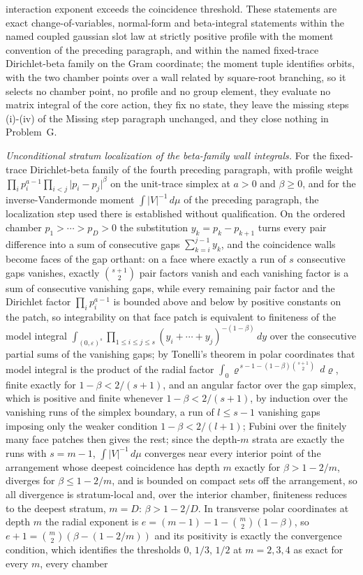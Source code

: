 interaction exponent exceeds the coincidence threshold. These statements are exact change-of-variables, normal-form and beta-integral statements within the named coupled gaussian slot law at strictly positive profile with the moment convention of the preceding paragraph, and within the named fixed-trace Dirichlet-beta family on the Gram coordinate; the moment tuple identifies orbits, with the two chamber points over a wall related by square-root branching, so it selects no chamber point, no profile and no group element, they evaluate no matrix integral of the core action, they fix no state, they leave the missing steps (i)-(iv) of the Missing step paragraph unchanged, and they close nothing in Problem~G.

\emph{Unconditional stratum localization of the beta-family wall integrals.} For the fixed-trace Dirichlet-beta family of the fourth preceding paragraph, with profile weight \(\prod_{i}p_{i}^{a-1}\prod_{i<j}\lvert p_{i}-p_{j}\rvert^{\beta}\) on the unit-trace simplex at \(a>0\) and \(\beta\ge0\), and for the inverse-Vandermonde moment \(\int\lvert V\rvert^{-1}\,d\mu\) of the preceding paragraph, the localization step used there is established without qualification. On the ordered chamber \(p_{1}>\cdots>p_{D}>0\) the substitution \(y_{k}=p_{k}-p_{k+1}\) turns every pair difference into a sum of consecutive gaps \(\sum_{k=i}^{j-1}y_{k}\), and the coincidence walls become faces of the gap orthant: on a face where exactly a run of \(s\) consecutive gaps vanishes, exactly \(\binom{s+1}{2}\) pair factors vanish and each vanishing factor is a sum of consecutive vanishing gaps, while every remaining pair factor and the Dirichlet factor \(\prod_{i}p_{i}^{a-1}\) is bounded above and below by positive constants on the patch, so integrability on that face patch is equivalent to finiteness of the model integral \(\int_{(0,\varepsilon)^{s}}\prod_{1\le i\le j\le s}(y_{i}+\cdots+y_{j})^{-(1-\beta)}\,dy\) over the consecutive partial sums of the vanishing gaps; by Tonelli's theorem in polar coordinates that model integral is the product of the radial factor \(\int_{0}\varrho^{\,s-1-(1-\beta)\binom{s+1}{2}}\,d\varrho\), finite exactly for \(1-\beta<2/(s+1)\), and an angular factor over the gap simplex, which is positive and finite whenever \(1-\beta<2/(s+1)\), by induction over the vanishing runs of the simplex boundary, a run of \(l\le s-1\) vanishing gaps imposing only the weaker condition \(1-\beta<2/(l+1)\); Fubini over the finitely many face patches then gives the rest; since the depth-\(m\) strata are exactly the runs with \(s=m-1\), \(\int\lvert V\rvert^{-1}\,d\mu\) converges near every interior point of the arrangement whose deepest coincidence has depth \(m\) exactly for \(\beta>1-2/m\), diverges for \(\beta\le1-2/m\), and is bounded on compact sets off the arrangement, so all divergence is stratum-local and, over the interior chamber, finiteness reduces to the deepest stratum, \(m=D\): \(\beta>1-2/D\). In transverse polar coordinates at depth \(m\) the radial exponent is \(e=(m-1)-1-\binom{m}{2}(1-\beta)\), so \(e+1=\binom{m}{2}(\beta-(1-2/m))\) and its positivity is exactly the convergence condition, which identifies the thresholds \(0\), \(1/3\), \(1/2\) at \(m=2,3,4\) as exact for every \(m\), every chamber 